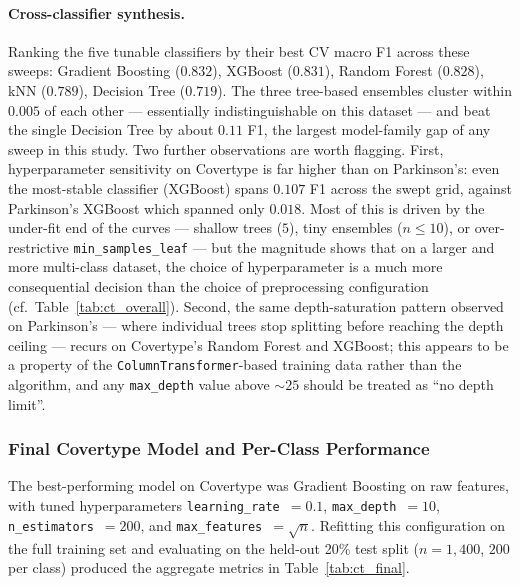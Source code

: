 \documentclass[11pt,a4paper]{article}
\begin{document}
\paragraph{Cross-classifier synthesis.}

Ranking the five tunable classifiers by their best CV macro F1 across these
sweeps: Gradient Boosting ($0.832$), XGBoost ($0.831$), Random Forest
($0.828$), kNN ($0.789$), Decision Tree ($0.719$). The three tree-based
ensembles cluster within $0.005$ of each other --- essentially indistinguishable
on this dataset --- and beat the single Decision Tree by about $0.11$ F1, the
largest model-family gap of any sweep in this study. Two further
observations are worth flagging. First, hyperparameter sensitivity on
Covertype is far higher than on Parkinson's: even the most-stable classifier
(XGBoost) spans $0.107$ F1 across the swept grid, against Parkinson's
XGBoost which spanned only $0.018$. Most of this is driven by the under-fit
end of the curves --- shallow trees ($5$), tiny ensembles ($n \leq 10$), or
over-restrictive \texttt{min\_samples\_leaf} --- but the magnitude shows
that on a larger and more multi-class dataset, the choice of hyperparameter
is a much more consequential decision than the choice of preprocessing
configuration (cf.\ Table~\ref{tab:ct_overall}). Second, the same
depth-saturation pattern observed on Parkinson's --- where individual trees
stop splitting before reaching the depth ceiling --- recurs on Covertype's
Random Forest and XGBoost; this appears to be a property of the
\texttt{ColumnTransformer}-based training data rather than the algorithm,
and any \texttt{max\_depth} value above $\sim 25$ should be treated as
``no depth limit''.

\subsubsection{Final Covertype Model and Per-Class Performance}\label{sec:ct_final}

The best-performing model on Covertype was Gradient Boosting on raw
features, with tuned hyperparameters \texttt{learning\_rate}~$= 0.1$,
\texttt{max\_depth}~$= 10$, \texttt{n\_estimators}~$= 200$, and
\texttt{max\_features}~$= \sqrt{n}$. Refitting this configuration on the full
training set and evaluating on the held-out 20\% test split
($n = 1{,}400$, $200$ per class) produced the aggregate metrics in
Table~\ref{tab:ct_final}.
\end{document}
